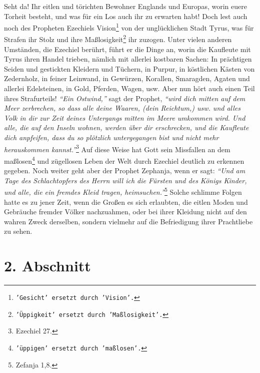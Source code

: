Seht da! Ihr eitlen und törichten Bewohner Englands und
Europas, worin euere
Torheit besteht, und was für ein Los auch ihr zu erwarten habt! Doch lest
auch noch des Propheten Ezechiels Vision\footnote{\texttt{'Gesicht' ersetzt
durch 'Vision'.}} von der unglücklichen Stadt Tyrus, was
für Strafen ihr Stolz und ihre Maßlosigkeit\footnote{\texttt{'Üppigkeit' ersetzt
durch 'Maßlosigkeit'.}} ihr zuzogen. Unter vielen anderen
Umständen, die Ezechiel berührt, führt er die Dinge an, worin die Kaufleute mit
Tyrus ihren Handel trieben, nämlich mit allerlei kostbaren Sachen: In prächtigen
Seiden und gestickten Kleidern und Tüchern, in Purpur, in köstlichen Kästen von
Zedernholz, in feiner Leinwand, in Gewürzen, Korallen, Smaragden,
Agaten und
allerlei Edelsteinen, in Gold, Pferden, Wagen, usw. Aber nun hört auch einen
Teil ihres Strafurteils! \textit{"`Ein Ostwind,"'} sagt der
Prophet,
\textit{"`wird dich mitten
auf dem Meer zerbrechen, so dass alle deine Waaren, (dein Reichtum,) usw.
und alles Volk in dir zur Zeit deines Untergangs mitten im Meere umkommen wird.
Und alle, die auf den Inseln wohnen, werden über dir erschrecken, und die
Kaufleute dich anpfeifen, dass du so plötzlich untergegangen bist und nicht mehr
herauskommen kannst."'}\footnote{Ezechiel 27.}
Auf diese Weise hat Gott sein Missfallen
an dem maßlosen\footnote{\texttt{'üppigen' ersetzt durch 'maßlosen'.}} und
zügellosen Leben der Welt durch Ezechiel deutlich zu erkennen
gegeben. Noch weiter geht aber der Prophet Zephanja, wenn er sagt:
\textit{"`Und am Tage
des Schlachtopfers des Herrn will ich die Fürsten und des Königs
Kinder, und alle, die ein fremdes Kleid tragen, heimsuchen."'}\footnote{Zefanja
1,8.}
Solche
schlimme Folgen hatte es zu jener Zeit, wenn die Großen es sich erlaubten, die
eitlen Moden und Gebräuche fremder Völker nachzuahmen, oder bei ihrer
Kleidung
nicht auf den wahren Zweck derselben, sondern vielmehr auf die Befriedigung
ihrer Prachtliebe zu sehen.

\section{2. Abschnitt} \label{kap15_ab2}

